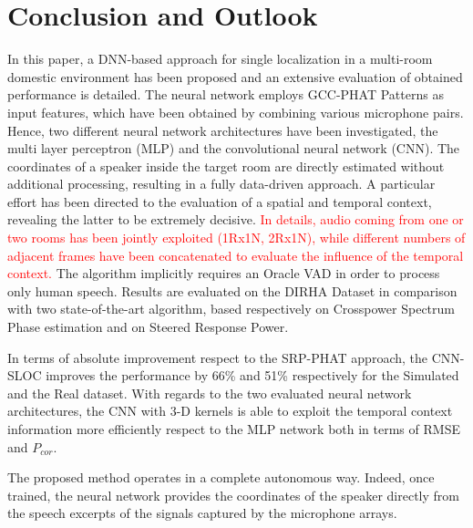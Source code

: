 \documentclass[review]{elsarticle}
\begin{document}
\section{Conclusion and Outlook}
\label{sec:concl}

In this paper, a DNN-based approach for single localization in a multi-room domestic environment has been proposed and an extensive evaluation of obtained performance is detailed. The neural network employs GCC-PHAT Patterns as input features, which have been obtained by combining various microphone pairs. Hence, two different neural network architectures have been investigated, the multi layer perceptron (MLP) and the convolutional neural network (CNN). The coordinates of a speaker inside the target room are directly estimated without additional processing, resulting in a fully data-driven approach.
A particular effort has been directed to the evaluation of a spatial and temporal context, revealing the latter to be extremely decisive. 	\textcolor{red}{In details, audio coming from one or two rooms has been jointly exploited (1Rx1N, 2Rx1N), while different numbers of adjacent frames have been concatenated to evaluate the influence of the temporal context.}
The algorithm implicitly requires an Oracle VAD in order to process only human speech. Results are evaluated on the DIRHA Dataset in comparison with two state-of-the-art algorithm, based respectively on Crosspower Spectrum Phase estimation and on Steered Response Power.

In terms of absolute improvement respect to the SRP-PHAT approach, the CNN-SLOC improves the performance by 66\% and 51\% respectively for the Simulated and the Real dataset. With regards to the two evaluated neural network architectures, the CNN with 3-D kernels is able to exploit the temporal context information more efficiently respect to the MLP network both in terms of RMSE and $P_{cor}$.


The proposed method operates in a complete autonomous way.
Indeed, once trained, the neural network provides the coordinates of the speaker directly from the speech excerpts of the signals captured by the microphone arrays.
\end{document}
